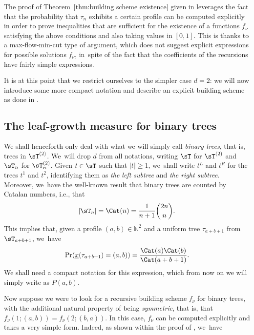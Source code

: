 The proof of Theorem~\ref{thm:building scheme existence} given in \cite{LW04} leverages the fact that the probability that $\tau_n$ exhibits a certain profile can be computed explicitly in order to prove inequalities that are sufficient for the existence of a functions $f_\nu$ satisfying the above conditions and also taking values in $[0,1]$. This is thanks to a max-flow-min-cut type of argument, which does not suggest explicit expressions for possible solutions $f_\nu$, in~spite of the fact that the coefficients of the recursions have fairly simple expressions.

It is at this point that we restrict ourselves to the simpler case $d=2$: we will now introduce some more compact notation and describe an explicit building scheme as done in \cite{CS20}.

\subsection{The leaf-growth measure for binary trees}

We shall henceforth only deal with what we will simply call \emph{binary trees}, that is, trees in $\sT^{(2)}$. We~will drop $d$ from all notations, writing $\sT$ for $\sT^{(2)}$ and $\sT_n$ for $\sT_n^{(2)}$. Given $t\in \sT$ such that $|t|\geq 1$, we~shall write $t^L$ and $t^R$ for the trees $t^1$ and $t^2$, identifying them as \emph{the left subtree} and \emph{the right subtree}. Moreover, we~have the well-known result that binary trees are counted by Catalan numbers, i.e., that
\[
|\sT_n|=\Cat(n)=\frac{1}{n+1}\binom{2n}{n}.
\]
This implies that, given a profile $(a,b)\in\mathbb{N}^2$ and a uniform tree $\tau_{a+b+1}$ from $\sT_{a+b+1}$, we~have
\[
\Pr(\underline{x}(\tau_{a+b+1})=(a,b))=\frac{\Cat(a)\Cat(b)}{\Cat(a+b+1)}.
\]
We shall need a compact notation for this expression, which from now on we will simply write as $P(a,b)$.

Now suppose we were to look for a recursive building scheme $f_\nu$ for binary trees, with the additional natural property of being \emph{symmetric}, that is, that $f_\nu(1;(a,b))=f_\nu(2; (b,a))$. In this case, $f_\nu$ can be computed explicitly and takes a very simple form. Indeed, as shown within the proof of \cite[Prop.\,5.1]{CS20}, we~have

